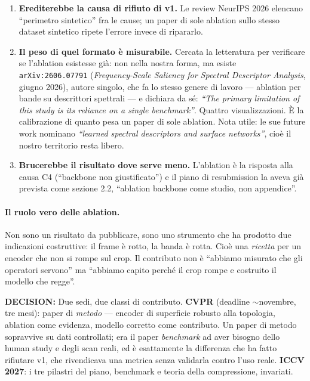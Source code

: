 \documentclass[11pt,a4paper]{article}
\newcommand{\decision}[1]{\textcolor{decision}{\textbf{DECISION:}} #1}
\begin{document}
\begin{enumerate}
\item \textbf{Erediterebbe la causa di rifiuto di v1.} Le review NeurIPS 2026 elencano
      ``perimetro sintetico'' fra le cause; un paper di sole ablation sullo stesso dataset
      sintetico ripete l'errore invece di ripararlo.
\item \textbf{Il peso di quel formato \`e misurabile.} Cercata la letteratura per verificare se
      l'ablation esistesse gi\`a: non nella nostra forma, ma esiste
      \texttt{arXiv:2606.07791} (\emph{Frequency-Scale Saliency for Spectral Descriptor
      Analysis}, giugno 2026), autore singolo, che fa lo stesso genere di lavoro --- ablation per
      bande su descrittori spettrali --- e dichiara da s\'e: \emph{``The primary limitation of
      this study is its reliance on a single benchmark''}. Quattro visualizzazioni. \`E la
      calibrazione di quanto pesa un paper di sole ablation. Nota utile: le sue future work
      nominano \emph{``learned spectral descriptors and surface networks''}, cio\`e il nostro
      territorio resta libero.
\item \textbf{Brucerebbe il risultato dove serve meno.} L'ablation \`e la risposta alla causa
      C4 (``backbone non giustificato'') e il piano di resubmission la aveva gi\`a prevista come
      sezione 2.2, ``ablation backbone come studio, non appendice''.
\end{enumerate}

\paragraph{Il ruolo vero delle ablation.} Non sono un risultato da pubblicare, sono uno
strumento che ha prodotto due indicazioni costruttive: il frame \`e rotto, la banda \`e rotta.
Cio\`e una \emph{ricetta} per un encoder che non si rompe sul crop. Il contributo non \`e
``abbiamo misurato che gli operatori servono'' ma ``abbiamo capito perch\'e il crop rompe e
costruito il modello che regge''.

\decision{Due sedi, due classi di contributo.
\textbf{CVPR} (deadline $\sim$novembre, tre mesi): paper di \emph{metodo} --- encoder di
superficie robusto alla topologia, ablation come evidenza, modello corretto come contributo. Un
paper di metodo sopravvive su dati controllati; era il paper \emph{benchmark} ad aver bisogno
dello human study e degli scan reali, ed \`e esattamente la differenza che ha fatto rifiutare v1,
che rivendicava una metrica senza validarla contro l'uso reale.
\textbf{ICCV 2027}: i tre pilastri del piano, benchmark e teoria della compressione, invariati.}
\end{document}
